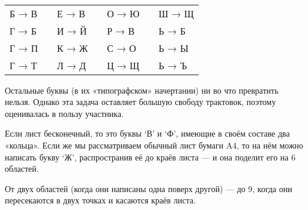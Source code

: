 \begin{itemize}

\def\ltr#1{`#1'}

\itA \ \\

\begin{center}\begin{tabular}{lllllll}
	Б → В & \quad & Е → В & & О → Ю & & Ш → Щ \\
	Г → Б & & И → Й & \quad & Р → В & & Ь → Б \\
	Г → П & & К → Ж & & С → О & \quad & Ь → Ы \\
	Г → Т & & Л → Д & & Ц → Щ & & Ь → Ъ
\end{tabular}\end{center}

Остальные буквы (в их «типографском» начертании) ни во что превратить нельзя. Однако эта задача оставляет большую свободу трактовок, поэтому оценивалась в пользу участника.

\itB Если лист бесконечный, то это буквы \ltr В и \ltr Ф, имеющие в своём составе два «кольца». Если же мы рассматриваем обычный лист бумаги A4, то на нём можно написать букву \ltr Ж, распространив её до краёв листа — и она поделит его на 6 областей.

\itC От двух областей (когда они написаны одна поверх другой) — до 9, когда они пересекаются в двух точках и касаются краёв листа.
\end{itemize}
